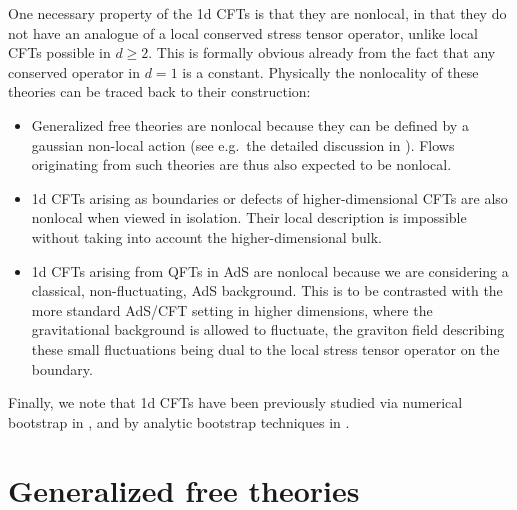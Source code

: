 \documentclass[12pt]{article}
\def\ge{\geqslant}
\numberwithin{equation}{section}
\begin{document}
One necessary property of the 1d CFTs is that they are nonlocal, in that they do not have an analogue of a local conserved stress tensor operator, unlike local CFTs possible in $d\ge 2$. This is formally obvious already from the fact that any conserved operator in $d=1$ is a constant. Physically the nonlocality of these theories can be traced back to their construction: 
\begin{itemize}
\item
Generalized free theories are nonlocal because they can be defined by a gaussian non-local action (see e.g.~the detailed discussion in \cite{Paulos:2015jfa}). Flows originating from such theories are thus also expected to be nonlocal. 

\item
1d CFTs arising as boundaries or defects of higher-dimensional CFTs are also nonlocal when viewed in isolation. Their local description is impossible without taking into account the higher-dimensional bulk. 

\item 1d CFTs arising from QFTs in AdS are nonlocal because we are considering a classical, non-fluctuating, AdS background. This is to be contrasted with the more standard AdS/CFT setting in higher dimensions, where the gravitational background is allowed to fluctuate, the graviton field describing these small fluctuations being dual to the local stress tensor operator on the boundary.
\end{itemize}

{Finally, we note that 1d CFTs have been previously studied via numerical bootstrap in \cite{Gaiotto:2013nva,El-Showk:2016mxr,Paulos:2016fap}, and by analytic bootstrap techniques in \cite{Mazac:2016qev,Hogervorst:2017sfd,Rychkov:2017tpc}. }

\section{Generalized free theories}
\label{GFF}
\end{document}
